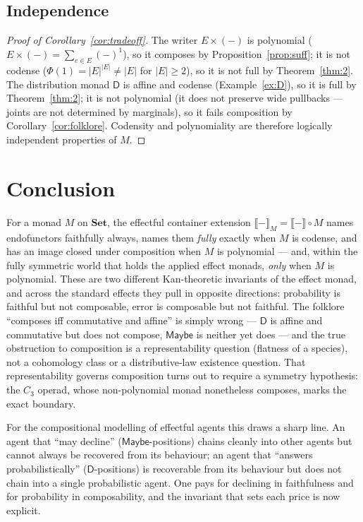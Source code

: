\documentclass[11pt]{amsart}
\theoremstyle{plain}
\theoremstyle{definition}
\newcommand{\Set}{\mathbf{Set}}
\newcommand{\ext}[1]{\llbracket #1 \rrbracket}
\newcommand{\extM}[1]{\llbracket #1 \rrbracket_{M}}
\newcommand{\D}{\mathsf{D}}
\newcommand{\Maybe}{\mathsf{Maybe}}
\begin{document}
\subsection{Independence}
\begin{proof}[Proof of Corollary~\ref{cor:tradeoff}]
The writer $E\times(-)$ is polynomial ($E\times(-)=\sum_{e\in E}(-)^1$), so it composes by
Proposition~\ref{prop:suff}; it is not codense ($\Phi(1)=|E|^{|E|}\ne|E|$ for $|E|\ge2$), so it is
not full by Theorem~\ref{thm:2}. The distribution monad $\D$ is affine and codense
(Example~\ref{ex:D}), so it is full by Theorem~\ref{thm:2}; it is not polynomial (it does not preserve
wide pullbacks --- joints are not determined by marginals), so it fails composition by
Corollary~\ref{cor:folklore}. Codensity and polynomiality are therefore logically independent
properties of $M$.
\end{proof}

\section{Conclusion}\label{sec:conc}

For a monad $M$ on $\Set$, the effectful container extension $\extM{-}=\ext{-}\circ M$ names
endofunctors faithfully always, names them \emph{fully} exactly when $M$ is codense, and has an image
closed under composition when $M$ is polynomial --- and, within the fully symmetric world that holds the
applied effect monads, \emph{only} when $M$ is polynomial. These are two different Kan-theoretic
invariants of the effect monad, and across the standard effects they pull in opposite directions:
probability is faithful but not composable, error is composable but not faithful. The folklore ``composes
iff commutative and affine'' is simply wrong --- $\D$ is affine and commutative but does not compose,
$\Maybe$ is neither yet does --- and the true obstruction to composition is a representability question
(flatness of a species), not a cohomology class or a distributive-law existence question. That
representability governs composition turns out to require a symmetry hypothesis: the $C_3$ operad, whose
non-polynomial monad nonetheless composes, marks the exact boundary.

For the compositional modelling of effectful agents this draws a sharp line. An agent that ``may
decline'' ($\Maybe$-positions) chains cleanly into other agents but cannot always be recovered from
its behaviour; an agent that ``answers probabilistically'' ($\D$-positions) is recoverable from its
behaviour but does not chain into a single probabilistic agent. One pays for declining in
faithfulness and for probability in composability, and the invariant that sets each price is now
explicit.
\end{document}
